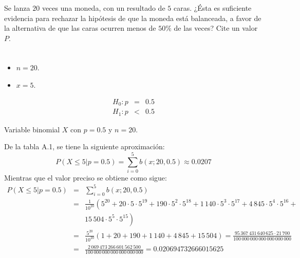 \begin{enunciado}
 Se lanza $20$ veces una moneda, con un resultado de $5$ caras.
 ¿\'Esta es suficiente evidencia para rechazar la hip\'otesis
 de que la moneda est\'a balanceada, a favor de la alternativa
 de que las caras ocurren menos de $50\%$ de las veces?
 Cite un valor $P$.
\end{enunciado}

\begin{solucion}
 \begin{datos}
  $\phantom{0}$
  \begin{itemize}
   \item $n = 20$.
   \item $x = 5$.
  \end{itemize}
 \end{datos}

 \begin{hipotesis}
  \begin{eqnarray*}
   H_0: p & = & 0.5 \\
   H_1: p & < & 0.5
  \end{eqnarray*}
 \end{hipotesis}

 \begin{estadistico}
  Variable binomial $X$ con $p = 0.5$ y $n = 20$.
 \end{estadistico}

 \begin{valorp}
  De la tabla A.1, se tiene la siguiente aproximaci\'on:
  \begin{equation*}
   P\left( X \leq 5 | p = 0.5 \right) = \sum_{i=0}^{5} b\left( x; 20, 0.5 \right)
   \approx 0.0207
  \end{equation*}
  Mientras que el valor preciso se obtiene como sigue:
  \begin{eqnarray*}
   P\left( X \leq 5 | p = 0.5 \right) & = & \sum_{i=0}^{5} b\left( x; 20, 0.5 \right) \\
   & = & \frac{1}{10^{20}} \left( 5^{20} + 20\cdot 5\cdot 5^{19} + 
   190 \cdot 5^2 \cdot 5^{18} + 1\,140\cdot 5^3 \cdot 5^{17} +
   4\,845 \cdot 5^4 \cdot 5^{16} + \right. \\
   & & \left. 15\,504\cdot 5^5 \cdot 5^{15} \right) \\
   & = & \frac{5^{20}}{10^{20}} (1 + 20 + 190 + 1\,140 + 4\,845 + 15\,504)
   = \frac{95\,367\,431\,640\,625 \cdot 21\,700}{100\,000\,000\,000\,000\,000\,000} \\
   & = & \frac{2\,069\,473\,266\,601\,562\,500}{100\,000\,000\,000\,000\,000\,000}
   = 0.020694732666015625
  \end{eqnarray*}
 \end{valorp}


\end{solucion}
